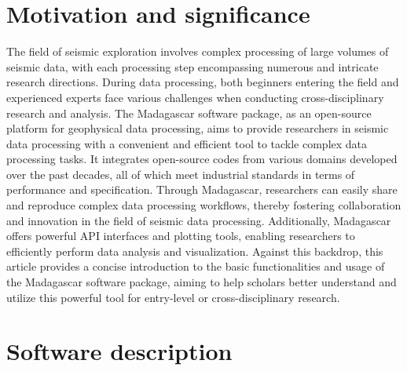 \section{Motivation and significance}
The field of seismic exploration involves complex processing of large volumes of seismic data, with each processing step encompassing numerous and intricate research directions. During data processing, both beginners entering the field and experienced experts face various challenges when conducting cross-disciplinary research and analysis. The Madagascar software package, as an open-source platform for geophysical data processing, aims to provide researchers in seismic data processing with a convenient and efficient tool to tackle complex data processing tasks. It integrates open-source codes from various domains developed over the past decades, all of which meet industrial standards in terms of performance and specification. Through Madagascar, researchers can easily share and reproduce complex data processing workflows, thereby fostering collaboration and innovation in the field of seismic data processing. Additionally, Madagascar offers powerful API interfaces and plotting tools, enabling researchers to efficiently perform data analysis and visualization. Against this backdrop, this article provides a concise introduction to the basic functionalities and usage of the Madagascar software package, aiming to help scholars better understand and utilize this powerful tool for entry-level or cross-disciplinary research.

\section*{Software description}


